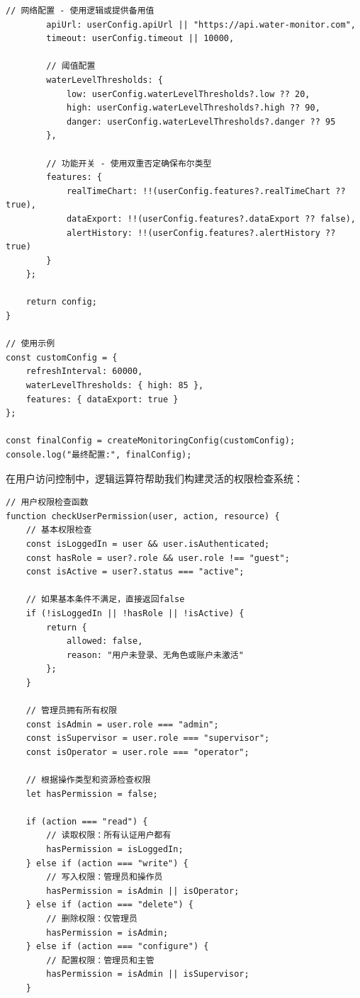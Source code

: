 {\begin{lstlisting}[style=javascript]
        // 网络配置 - 使用逻辑或提供备用值
        apiUrl: userConfig.apiUrl || "https://api.water-monitor.com",
        timeout: userConfig.timeout || 10000,
        
        // 阈值配置
        waterLevelThresholds: {
            low: userConfig.waterLevelThresholds?.low ?? 20,
            high: userConfig.waterLevelThresholds?.high ?? 90,
            danger: userConfig.waterLevelThresholds?.danger ?? 95
        },
        
        // 功能开关 - 使用双重否定确保布尔类型
        features: {
            realTimeChart: !!(userConfig.features?.realTimeChart ?? true),
            dataExport: !!(userConfig.features?.dataExport ?? false),
            alertHistory: !!(userConfig.features?.alertHistory ?? true)
        }
    };
    
    return config;
}

// 使用示例
const customConfig = {
    refreshInterval: 60000,
    waterLevelThresholds: { high: 85 },
    features: { dataExport: true }
};

const finalConfig = createMonitoringConfig(customConfig);
console.log("最终配置:", finalConfig);
\end{lstlisting}


在用户访问控制中，逻辑运算符帮助我们构建灵活的权限检查系统：

\begin{lstlisting}[style=javascript]
// 用户权限检查函数
function checkUserPermission(user, action, resource) {
    // 基本权限检查
    const isLoggedIn = user && user.isAuthenticated;
    const hasRole = user?.role && user.role !== "guest";
    const isActive = user?.status === "active";
    
    // 如果基本条件不满足，直接返回false
    if (!isLoggedIn || !hasRole || !isActive) {
        return {
            allowed: false,
            reason: "用户未登录、无角色或账户未激活"
        };
    }
    
    // 管理员拥有所有权限
    const isAdmin = user.role === "admin";
    const isSupervisor = user.role === "supervisor";
    const isOperator = user.role === "operator";
    
    // 根据操作类型和资源检查权限
    let hasPermission = false;
    
    if (action === "read") {
        // 读取权限：所有认证用户都有
        hasPermission = isLoggedIn;
    } else if (action === "write") {
        // 写入权限：管理员和操作员
        hasPermission = isAdmin || isOperator;
    } else if (action === "delete") {
        // 删除权限：仅管理员
        hasPermission = isAdmin;
    } else if (action === "configure") {
        // 配置权限：管理员和主管
        hasPermission = isAdmin || isSupervisor;
    }
    

\end{lstlisting}}
